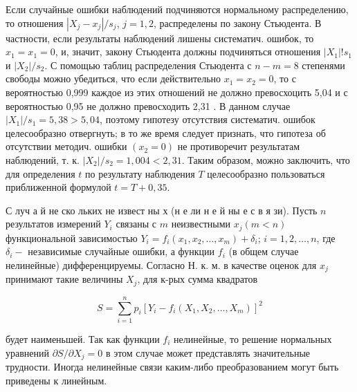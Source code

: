 \documentclass[10pt]{article}
\begin{document}
Если случайные ошибки наблюдений подчиняются нормальному распределению, то отношения $\left|X_{j}-x_{j}\right| / s_{j}$, $j=1,2$, распределены по закону Стьюдента. В частности, если результаты наблюдений лишены систематич. ошибок, то $x_{1}=x_{1}=0$, и, значит, закону Стьюдента должны подчиняться отношения $\left|X_{1}\right| ! s_{1}$ и $\left|X_{2}\right| / s_{2}$. С помощью таблиц распределения Стьюдента с $n-m=8$ степенями свободы можно убедиться, что если действительно $x_{1}=x_{2}=0$, то с вероятностью 0,999 каждое из этих отношений не должно превосхоцить 5,04 и с вероятностью 0,95 не должно превосходить 2,31 . В данном случае $\left|X_{1}\right| / s_{1}=5,38>5,04$, поэтому гипотезу отсутствия систематич. ошибок целесообразно отвергнуть; в то же время следует признать, что гипотеза об отсутствии методич. ошибки $\left(x_{2}=0\right)$ не противоречит результатам наблюдений, т. к. $\left|X_{2}\right| / s_{2}=1,004<2,31$. Таким образом, можно заключить, что для определения $t$ по результату наблюдения $T$ целесообразно пользоваться приближенной формулой $t=T+0,35$.



С луч а й не ско льких не извест ны х (н е ли н е й ны е с в я зи). Пусть $n$ результатов измерений $Y_{i}$ связаны с $m$ неизвестными $x_{j}(m<n)$ функциональной зависимостью $Y_{i}=f_{i}\left(x_{1}, x_{2}, \ldots, x_{m}\right)+\delta_{i}$; $i=1,2, \ldots, n$, где $\delta_{i}-$ независимые случайные ошибки, а функции $f_{i}$ (в общем случае нелинейные) дифференцируемы. Согласно Н. к. м. в качестве оценок для $x_{j}$ принимают такие величины $X_{j}$, для к-рых сумма квадратов



\[

S=\sum_{i=1}^{n} p_{i}\left[Y_{i}-f_{i}\left(X_{1}, X_{2}, \ldots, X_{m}\right)\right]^{2}

\]



будет наименьшей. Так как функции $f_{i}$ нелинейные, то решение нормальных уравнений $\partial S / \partial X_{j}=0$ в этом случае может представлять значительные трудности. Иногда нелинейные связи каким-либо преобразованием могут быть приведены к линейным.
\end{document}

